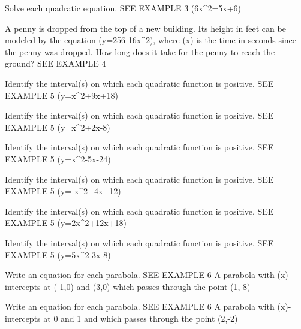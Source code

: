 \documentclass{article}
\newenvironment{practice}[2]{}{}        %
\newcommand{\answer}[1]{}               %
\begin{document}
\begin{practice}{29}{1}
Solve each quadratic equation. SEE EXAMPLE 3
(6x^2=5x+6)
\answer{(-\frac{2}{3}, \frac{3}{2})}
\end{practice}
\begin{practice}{30}{2}
A penny is dropped from the top of a new building. Its height in feet can be modeled by the equation (y=256-16x^2), where (x) is the time in seconds since the penny was dropped. How long does it take for the penny to reach the ground? SEE EXAMPLE 4
\answer{4 seconds}
\end{practice}
\begin{practice}{31}{2}
Identify the interval(s) on which each quadratic function is positive. SEE EXAMPLE 5
(y=x^2+9x+18)
\answer{(x<-6, x>-3)}
\end{practice}
\begin{practice}{32}{2}
Identify the interval(s) on which each quadratic function is positive. SEE EXAMPLE 5
(y=x^2+2x-8)
\answer{(x<-4, x>2)}
\end{practice}
\begin{practice}{33}{2}
Identify the interval(s) on which each quadratic function is positive. SEE EXAMPLE 5
(y=x^2-5x-24)
\answer{(x<-3, x>8)}
\end{practice}
\begin{practice}{34}{2}
Identify the interval(s) on which each quadratic function is positive. SEE EXAMPLE 5
(y=-x^2+4x+12)
\answer{(-2<x<6)}
\end{practice}
\begin{practice}{35}{2}
Identify the interval(s) on which each quadratic function is positive. SEE EXAMPLE 5
(y=2x^2+12x+18)
\answer{(x\neq-3)}
\end{practice}
\begin{practice}{36}{2}
Identify the interval(s) on which each quadratic function is positive. SEE EXAMPLE 5
(y=5x^2-3x-8)
\answer{(x<-1, x>\frac{8}{5})}
\end{practice}
\begin{practice}{37}{1}
Write an equation for each parabola. SEE EXAMPLE 6
A parabola with (x)-intercepts at (-1,0) and (3,0) which passes through the point (1,-8)
\answer{(y=2x^2-4x-6) or (y=2(x+1)(x-3))}
\end{practice}
\begin{practice}{38}{1}
Write an equation for each parabola. SEE EXAMPLE 6
A parabola with (x)-intercepts at 0 and 1 and which passes through the point (2,-2)
\answer{(y=-x^2+x) or (y=-x(x-1))}
\end{practice}
\end{document}
